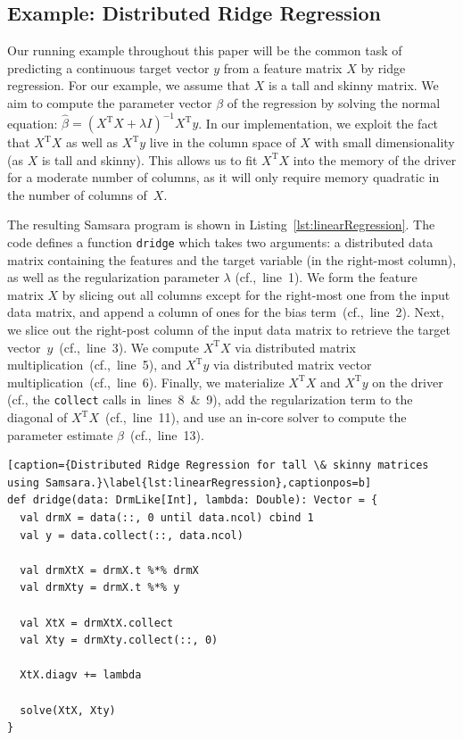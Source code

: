 \documentclass{article}
\begin{document}

\subsection{Example: Distributed Ridge Regression}

Our running example throughout this paper will be the common task of predicting a continuous target vector $y$ from a feature matrix $X$ by ridge regression. For our example, we assume that $X$ is a tall and skinny matrix. We aim to compute the parameter vector $\beta$ of the regression by solving the normal equation: $\hat{\beta} = (X^\mathrm{T}X + \lambda I)^{-1} X^\mathrm{T}y$. In our implementation, we exploit the fact that $X^\mathrm{T} X$ as well as $X^\mathrm{T} y$ live in the column space of $X$ with small dimensionality (as $X$ is tall and skinny). This allows us to fit $X^\mathrm{T} X$ into the memory of the driver for a moderate number of columns, as it will only require memory quadratic in the number of columns of~$X$.

The resulting Samsara program is shown in Listing~\ref{lst:linearRegression}. The code defines a function \texttt{dridge} which takes two arguments: a distributed data matrix containing the features and the target variable (in the right-most column), as well as the regularization parameter $\lambda$ (cf.,~line~1). We form the feature matrix $X$ by slicing out all columns except for the right-most one from the input data matrix, and append a column of ones for the bias term~(cf.,~line~2). Next, we slice out the right-post column of the input data matrix to retrieve the target vector~$y$~(cf.,~line~3). We compute $X^\mathrm{T} X$ via distributed matrix multiplication~(cf.,~line~5), and $X^\mathrm{T}y$ via distributed matrix vector multiplication~(cf.,~line~6). Finally, we materialize $X^\mathrm{T} X$ and $X^\mathrm{T} y$ on the driver (cf., the \texttt{collect} calls in~lines~8~\&~9), add the regularization term to the diagonal of $X^\mathrm{T} X$~(cf.,~line~11), and use an in-core solver to compute the parameter estimate $\beta$~(cf.,~line~13).

\begin{lstlisting}[caption={Distributed Ridge Regression for tall \& skinny matrices using Samsara.}\label{lst:linearRegression},captionpos=b] 
def dridge(data: DrmLike[Int], lambda: Double): Vector = {
  val drmX = data(::, 0 until data.ncol) cbind 1
  val y = data.collect(::, data.ncol)

  val drmXtX = drmX.t %*% drmX
  val drmXty = drmX.t %*% y

  val XtX = drmXtX.collect 
  val Xty = drmXty.collect(::, 0) 

  XtX.diagv += lambda

  solve(XtX, Xty)
}
\end{lstlisting}
\end{document}
